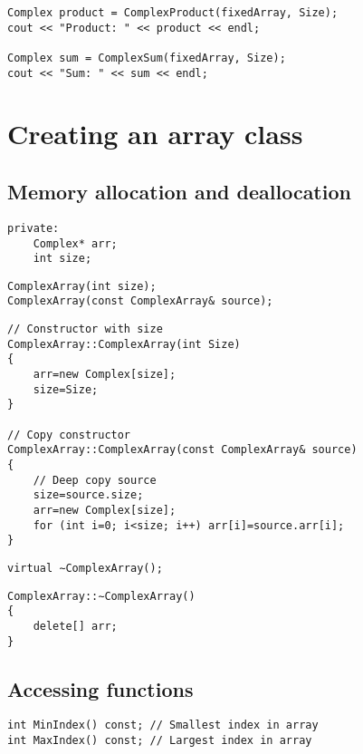 \begin{lstlisting}
Complex product = ComplexProduct(fixedArray, Size);
cout << "Product: " << product << endl;

Complex sum = ComplexSum(fixedArray, Size);
cout << "Sum: " << sum << endl;
\end{lstlisting}

\section{Creating an array class}

\subsection{Memory allocation and deallocation}

\begin{lstlisting}
private:
	Complex* arr;
	int size;
\end{lstlisting}

\begin{lstlisting}
ComplexArray(int size);
ComplexArray(const ComplexArray& source);
\end{lstlisting}

\begin{lstlisting}
// Constructor with size
ComplexArray::ComplexArray(int Size)
{
	arr=new Complex[size];
	size=Size;
}

// Copy constructor
ComplexArray::ComplexArray(const ComplexArray& source)
{
	// Deep copy source
	size=source.size;
	arr=new Complex[size];
	for (int i=0; i<size; i++) arr[i]=source.arr[i];
}
\end{lstlisting}

\begin{lstlisting}
virtual ∼ComplexArray();
\end{lstlisting}

\begin{lstlisting}
ComplexArray::∼ComplexArray()
{
	delete[] arr;
}
\end{lstlisting}

\subsection{Accessing functions}

\begin{lstlisting}
int MinIndex() const; // Smallest index in array
int MaxIndex() const; // Largest index in array
\end{lstlisting}

